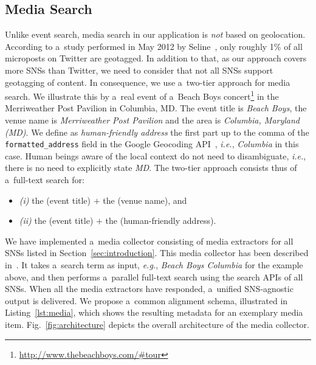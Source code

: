 \documentclass[runningheads,a4paper]{llncs}
\begin{document}
{\subsection{Media Search}                                                   \label{sec:media-search}
Unlike event search, media search in our application is \emph{not} based on geolocation. According to a~study performed in May 2012 by Seline~\cite{Quora2012},
only roughly 1\% of all microposts on Twitter are geotagged. In addition to that, as our approach covers more SNSs than Twitter, we need to consider that not all SNSs support geotagging of content. In consequence, we use a~two-tier approach for media search. We illustrate this by a~real event of a~Beach Boys concert\footnote{\url{http://www.thebeachboys.com/\#tour}} in the Merriweather Post Pavilion in Columbia, MD. The event title is \emph{Beach Boys},
the venue name is \emph{Merriweather Post Pavilion} and the area is \emph{Columbia, Maryland (MD)}. We define as \emph{human-friendly address} the first part up to the comma of the \texttt{formatted\_address} field in the Google Geocoding API~\cite{Geocoding2012}, \emph{i.e.}, \emph{Columbia} in this case. Human beings aware of the local context do not need to disambiguate, \emph{i.e.}, there is no need to explicitly state \emph{MD}. The two-tier approach consists thus of a~full-text search for:
\begin{itemize}
 \item \emph{(i)} the (event title) $+$ the (venue name), and
 \item \emph{(ii)} the (event title) $+$ the (human-friendly address).
\end{itemize}

We have implemented a~media collector consisting of media extractors for all SNSs listed in Section~\ref{sec:introduction}. This media collector has been described in~\cite{Khrouf:RAMSS12,Rizzo:SAM12}. It takes a~search term as input, \emph{e.g.}, \emph{Beach Boys Columbia} for the example above, and then performs a~parallel full-text search using the search APIs of all SNSs. When all the media extractors have responded, a~unified SNS-agnostic output is delivered. We propose a~common alignment schema, illustrated in Listing~\ref{lst:media}, which shows the resulting metadata for an exemplary media item. Fig.~\ref{fig:architecture} depicts the overall architecture of the media collector.

}
\end{document}
